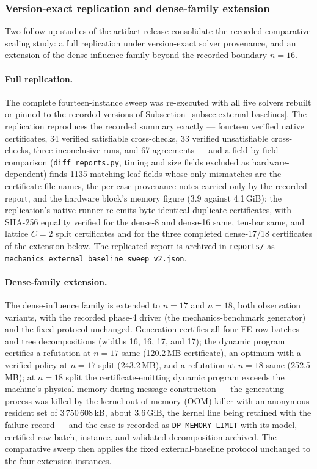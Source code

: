 \documentclass[11pt]{article}
\theoremstyle{plain}
\theoremstyle{definition}
\theoremstyle{remark}
\begin{document}
\subsubsection{Version-exact replication and dense-family extension}
\label{subsubsec:replication-extension}

Two follow-up studies of the artifact release consolidate the recorded comparative
scaling study: a full replication under version-exact solver provenance,
and an extension of the dense-influence family beyond the recorded boundary
\(n{=}16\).

\paragraph{Full replication.}
The complete fourteen-instance sweep was re-executed with all five solvers
rebuilt or pinned to the recorded versions of
Subsection~\ref{subsec:external-baselines}.
The replication reproduces the recorded summary exactly --- fourteen
verified native certificates, 34 verified satisfiable cross-checks, 33
verified unsatisfiable cross-checks, three inconclusive runs, and 67
agreements --- and a field-by-field comparison
(\texttt{diff\_reports.py}, timing and size fields excluded as
hardware-dependent) finds 1135 matching leaf fields whose only mismatches are
the certificate file names, the per-case provenance notes carried only by the
recorded report, and the hardware block's memory figure (3.9 against
4.1\,GiB); the replication's native runner re-emits byte-identical duplicate
certificates, with SHA-256 equality verified for the dense-8 and dense-16
same, ten-bar same, and lattice \(C{=}2\) split certificates and for the
three completed dense-17/18 certificates of the extension below.
The replicated report is archived in \texttt{reports/} as
\texttt{mechanics\_external\_baseline\_sweep\_v2.json}.

\paragraph{Dense-family extension.}
The dense-influence family is extended to \(n{=}17\) and \(n{=}18\), both
observation variants, with the recorded phase-4 driver (the
mechanics-benchmark generator) and the fixed
protocol unchanged.  Generation certifies all four FE row batches and
tree decompositions (widths 16, 16, 17, and 17); the dynamic program
certifies a refutation at \(n{=}17\) same (120.2\,MB certificate), an
optimum with a verified policy at \(n{=}17\) split (243.2\,MB), and a
refutation at \(n{=}18\) same (252.5\,MB); at \(n{=}18\) split the
certificate-emitting dynamic program exceeds the machine's physical memory
during message construction --- the generating process was killed by the
kernel out-of-memory (OOM) killer with an anonymous resident set of 3\,750\,608\,kB, about
3.6\,GiB, the kernel line being retained with the failure record --- and the
case is recorded
as \texttt{DP-MEMORY-LIMIT} with its model, certified row batch, instance,
and validated decomposition archived.  The comparative sweep then applies
the fixed external-baseline protocol unchanged to the four extension
instances.
\end{document}

